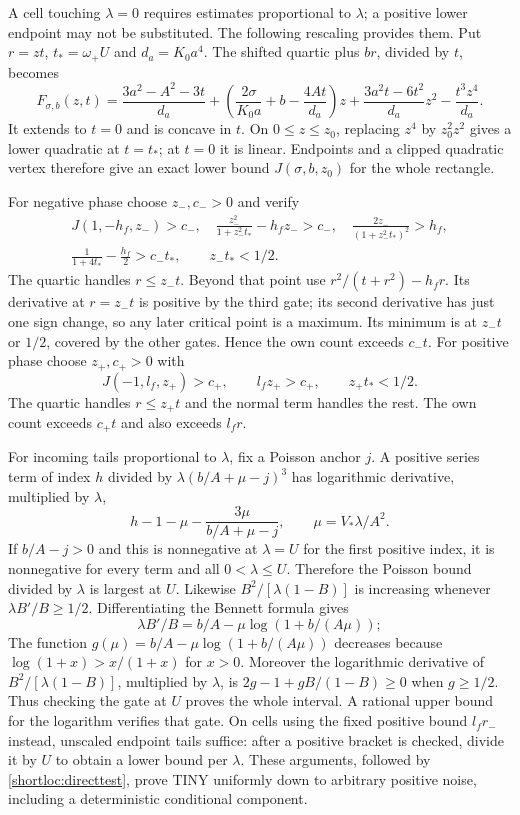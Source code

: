 A cell touching $\lambda=0$ requires estimates proportional to $\lambda$;
a positive lower endpoint may not be substituted. The following rescaling
provides them. Put $r=zt$, $t_*=\omega_+U$ and $d_a=K_0a^4$.
The shifted quartic plus $br$, divided by $t$, becomes
\begin{equation}\label{shortloc:scaledown}
 F_{\sigma,b}(z,t)=\frac{3a^2-A^2-3t}{d_a}
 +\left(\frac{2\sigma}{K_0a}+b-\frac{4At}{d_a}\right)z
 +\frac{3a^2t-6t^2}{d_a}z^2-\frac{t^3z^4}{d_a}.
\end{equation}
It extends to $t=0$ and is concave in $t$. On $0\le z\le z_0$, replacing
$z^4$ by $z_0^2z^2$ gives a lower quadratic at $t=t_*$; at $t=0$ it is
linear. Endpoints and a clipped quadratic vertex therefore give an exact
lower bound $J(\sigma,b,z_0)$ for the whole rectangle.

For negative phase choose $z_-,c_->0$ and verify
\begin{gather}\label{shortloc:tinynegative}
 J(1,-h_f,z_-)>c_-,\quad
 \frac{z_-^2}{1+z_-^2t_*}-h_fz_->c_-,\quad
 \frac{2z_-}{(1+z_-^2t_*)^2}>h_f,\\
 \frac1{1+4t_*}-\frac{h_f}{2}>c_-t_*,\qquad z_-t_*<1/2.\nonumber
\end{gather}
The quartic handles $r\le z_-t$. Beyond that point use
$r^2/(t+r^2)-h_fr$. Its derivative at $r=z_-t$ is positive by the third
gate; its second derivative has just one sign change, so any later critical
point is a maximum. Its minimum is at $z_-t$ or $1/2$, covered by the other
gates. Hence the own count exceeds $c_-t$.
For positive phase choose $z_+,c_+>0$ with
\begin{equation}\label{shortloc:tinypositive}
 J(-1,l_f,z_+)>c_+,\qquad l_fz_+>c_+,\qquad z_+t_*<1/2.
\end{equation}
The quartic handles $r\le z_+t$ and the normal term handles the rest.
The own count exceeds $c_+t$ and also exceeds $l_fr$.

For incoming tails proportional to $\lambda$, fix a Poisson anchor $j$.
A positive series term of index $h$ divided by
$\lambda(b/A+\mu-j)^3$ has logarithmic derivative, multiplied by $\lambda$,
\[
 h-1-\mu-\frac{3\mu}{b/A+\mu-j},\qquad \mu=V_*\lambda/A^2.
\]
If $b/A-j>0$ and this is nonnegative at $\lambda=U$ for the first positive
index, it is nonnegative for every term and all $0<\lambda\le U$.
Therefore the Poisson bound divided by $\lambda$ is largest at $U$.
Likewise $B^2/[\lambda(1-B)]$ is increasing whenever
$\lambda B'/B\ge1/2$. Differentiating the Bennett formula gives
\[
 \lambda B'/B=b/A-\mu\log(1+b/(A\mu));
\]
The function $g(\mu)=b/A-\mu\log(1+b/(A\mu))$ decreases because
$\log(1+x)>x/(1+x)$ for $x>0$. Moreover the logarithmic derivative of
$B^2/[\lambda(1-B)]$, multiplied by $\lambda$, is
$2g-1+gB/(1-B)\ge0$ when $g\ge1/2$. Thus checking the gate at $U$
proves the whole interval. A rational upper bound for the logarithm
verifies that gate. On cells using the fixed positive bound $l_fr_-$ instead,
unscaled endpoint tails suffice: after a positive bracket is checked, divide
it by $U$ to obtain a lower bound per $\lambda$. These arguments, followed by
\eqref{shortloc:directtest}, prove TINY uniformly down to arbitrary positive
noise, including a deterministic conditional component.

